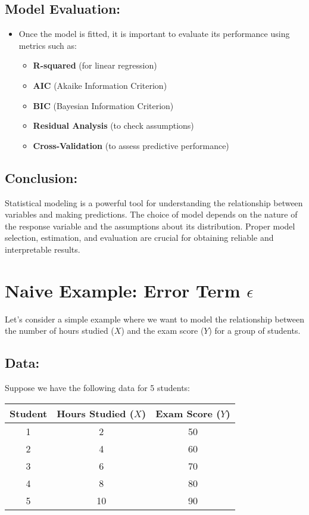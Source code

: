 \documentclass{article}
\begin{document}
\subsection*{Model Evaluation:}

\begin{itemize}
    \item Once the model is fitted, it is important to evaluate its performance using metrics such as:
    \begin{itemize}
        \item \textbf{R-squared} (for linear regression)
        \item \textbf{AIC} (Akaike Information Criterion)
        \item \textbf{BIC} (Bayesian Information Criterion)
        \item \textbf{Residual Analysis} (to check assumptions)
        \item \textbf{Cross-Validation} (to assess predictive performance)
    \end{itemize}
\end{itemize}

\subsection*{Conclusion:}

Statistical modeling is a powerful tool for understanding the relationship between variables and making predictions. The choice of model depends on the nature of the response variable and the assumptions about its distribution. Proper model selection, estimation, and evaluation are crucial for obtaining reliable and interpretable results.

\section*{Naive Example: Error Term \( \epsilon \)}

Let's consider a simple example where we want to model the relationship between the number of hours studied (\( X \)) and the exam score (\( Y \)) for a group of students.

\subsection*{Data:}

Suppose we have the following data for 5 students:

\begin{center}
\begin{tabular}{|c|c|c|}
\hline
Student & Hours Studied (\( X \)) & Exam Score (\( Y \)) \\
\hline
1 & 2 & 50 \\
2 & 4 & 60 \\
3 & 6 & 70 \\
4 & 8 & 80 \\
5 & 10 & 90 \\
\hline
\end{tabular}
\end{center}
\end{document}
